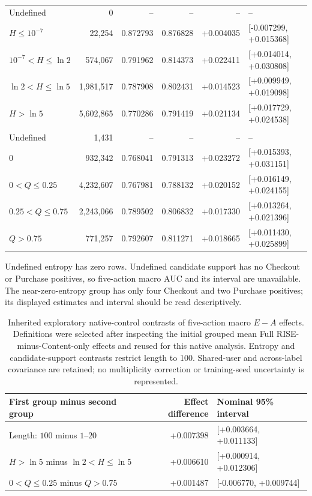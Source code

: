 \begin{table}[t]
\begin{tabular}{lrrrrl}
Undefined & 0 & -- & -- & -- & -- \\
$H\leq10^{-7}$ & 22,254 & 0.872793 & 0.876828 & +0.004035 & [-0.007299, +0.015368] \\
$10^{-7}<H\leq\ln2$ & 574,067 & 0.791962 & 0.814373 & +0.022411 & [+0.014014, +0.030808] \\
$\ln2<H\leq\ln5$ & 1,981,517 & 0.787908 & 0.802431 & +0.014523 & [+0.009949, +0.019098] \\
$H>\ln5$ & 5,602,865 & 0.770286 & 0.791419 & +0.021134 & [+0.017729, +0.024538] \\
\addlinespace[2pt]\multicolumn{6}{l}{\textit{Candidate-category fraction $Q$, $L=100$}} \\
Undefined & 1,431 & -- & -- & -- & -- \\
$0$ & 932,342 & 0.768041 & 0.791313 & +0.023272 & [+0.015393, +0.031151] \\
$0<Q\leq0.25$ & 4,232,607 & 0.767981 & 0.788132 & +0.020152 & [+0.016149, +0.024155] \\
$0.25<Q\leq0.75$ & 2,243,066 & 0.789502 & 0.806832 & +0.017330 & [+0.013264, +0.021396] \\
$Q>0.75$ & 771,257 & 0.792607 & 0.811271 & +0.018665 & [+0.011430, +0.025899] \\
\bottomrule\end{tabular}
\par\smallskip\begin{minipage}{0.99\textwidth}\footnotesize
Undefined entropy has zero rows. Undefined candidate support has no Checkout
or Purchase positives, so five-action macro AUC and its interval are unavailable.
The near-zero-entropy group has only four Checkout and two Purchase positives;
its displayed estimates and interval should be read descriptively.
\end{minipage}
\end{table}

\begin{table}[t]
\centering\small
\caption{Inherited exploratory native-control contrasts of five-action macro
$E-A$ effects. Definitions were selected after inspecting the initial grouped
mean Full RISE-minus-Content-only effects and reused for this native analysis.
Entropy and candidate-support contrasts restrict length to 100.
Shared-user and across-label covariance are retained; no multiplicity correction
or training-seed uncertainty is represented.}
\label{tab:native_group_contrasts}
\begin{tabular}{lrl}\toprule
First group minus second group & Effect difference & Nominal 95\% interval \\
\midrule
Length: $100$ minus $1$--$20$ & +0.007398 & [+0.003664, +0.011133] \\
$H>\ln5$ minus $\ln2<H\leq\ln5$ & +0.006610 & [+0.000914, +0.012306] \\
$0<Q\leq0.25$ minus $Q>0.75$ & +0.001487 & [-0.006770, +0.009744] \\
\bottomrule\end{tabular}
\end{table}

